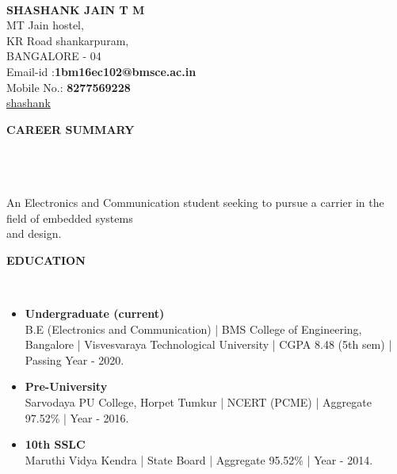 \documentclass[a4paper,10pt]{article}
\newcommand{\lsep}{-0.5cm}
\newcommand{\resheading}[1]{{\small \colorbox{mygrey}{\begin{minipage}{0.975\textwidth}{\textbf{#1 \vphantom{p\^{E}}}}\end{minipage}}}}
\begin{document}
\hspace{0.5cm}\\[-0.2cm]



\textbf{SHASHANK JAIN T M} \\ 
\indent MT Jain hostel, \\
\indent KR Road shankarpuram,\\
\indent BANGALORE - 04\\
\indent Email-id :\textbf{1bm16ec102@bmsce.ac.in} \\
\indent Mobile No.: \textbf{8277569228} \\
\indent\faGithub\href{https://github.com/shashankjainTM}{shashank}\hfill 
{}\\

\resheading{\textbf{CAREER SUMMARY} }\\[\lsep]\\ \\
\indent An Electronics and Communication student seeking to pursue a carrier in the field of embedded systems\\ \indent and design.\\

\resheading{\textbf{EDUCATION} }\\[\lsep]
\begin{itemize}
\item \noindent \textbf{Undergraduate (current)}\\
\indent B.E (Electronics and Communication) | BMS College of Engineering, Bangalore | Visvesvaraya Technological University | CGPA 8.48 (5th sem) | Passing Year - 2020.

\item \noindent \textbf{Pre-University}\\
\indent Sarvodaya PU College, Horpet Tumkur | NCERT (PCME) | Aggregate 97.52\% | Year - 2016.

\item \noindent \textbf{10th SSLC}\\
\indent Maruthi Vidya Kendra | State Board | Aggregate 95.52\% | Year - 2014.
\end{itemize}
\end{document}
